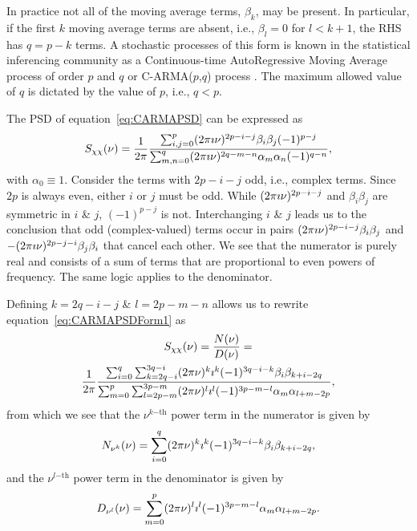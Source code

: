 \documentclass[a4paper,fleqn,usenatbib]{mnras}
\begin{document}
In practice not all of the moving average terms, $\beta_{k}$, may be present. In particular, if the first $k$ moving average terms are absent, i.e., $\beta_{l} = 0$ for $l < k+1$, the RHS has $q = p - k$ terms. A stochastic processes of this form is known in the statistical inferencing community as a Continuous-time AutoRegressive Moving Average process of order $p$ and $q$ or C-ARMA($p$,$q$) process \citep{DimensionEstimationBrockwell,HandbookOfStatistics19Brockwell,Brockwell14,Kelly14}. The maximum allowed value of $q$ is dictated by the value of $p$, i.e., $q < p$.

The PSD of equation~\eqref{eq:CARMAPSD} can be expressed as
\begin{equation}\label{eq:CARMAPSDForm1}
S_{\chi\chi}(\nu) = \frac{1}{2 \pi }\frac{\sum_{i,j = 0}^{p} (2 \pi \imath \nu)^{2p - i -j} \beta_{i} \beta_{j} (-1)^{p - j}}{\sum_{m,n = 0}^{q} (2 \pi \imath \nu)^{2q - m -n} \alpha_{m} \alpha_{n} (-1)^{q - n}},
\end{equation}
with $\alpha_{0} \equiv 1$. Consider the terms with $2p - i - j$ odd, i.e., complex terms. Since $2p$ is always even, either $i$ or $j$ must be odd. While $(2 \pi \imath \nu)^{2p - i -j}$ and $\beta_{i} \beta_{j}$ are symmetric in $i$ \& $j$, $(-1)^{p - j}$ is not. Interchanging $i$ \& $j$ leads us to the conclusion that odd (complex-valued) terms occur in pairs $(2 \pi \imath \nu)^{2p - i -j}\beta_{i} \beta_{j}$ and $-(2 \pi \imath \nu)^{2p - j -i}\beta_{j} \beta_{i}$ that cancel each other. We see that the numerator is purely real and consists of a sum of terms that are proportional to even powers of frequency. The same logic applies to the denominator.

Defining $k = 2q - i - j$ \& $l = 2p - m - n$ allows us to rewrite equation~\eqref{eq:CARMAPSDForm1} as
\begin{multline}\label{eq:CARMAPSDForm1}
S_{\chi\chi}(\nu) = \frac{N(\nu)}{D(\nu)} = \\ \frac{1}{2 \pi } \frac{\sum_{i = 0}^{q}\sum_{k = 2q - i}^{3q - i} (2\pi\nu)^{k} \imath^{k} (-1)^{3q - i - k} \beta_{i}\beta_{k + i - 2q}}{\sum_{m = 0}^{p}\sum_{l = 2p - m}^{3p - m} (2\pi\nu)^{l} \imath^{l} (-1)^{3p - m - l} \alpha_{m}\alpha_{l + m - 2p}},
\end{multline}
from which we see that the $\nu^{k\mathrm{-th}}$ power term in the numerator is given by
\begin{equation}\label{eq:PSDNumerator}
N_{\nu^{k}}(\nu) = \sum_{i = 0}^{q} (2\pi\nu)^{k} \imath^{k} (-1)^{3q - i - k} \beta_{i}\beta_{k + i - 2q},
\end{equation}
and the $\nu^{l\mathrm{-th}}$ power term in the denominator is given by
\begin{equation}\label{eq:PSDDenominator}
D_{\nu^{l}}(\nu) = \sum_{m = 0}^{p} (2\pi\nu)^{l} \imath^{l} (-1)^{3p - m - l} \alpha_{m}\alpha_{l + m - 2p}.
\end{equation}
\end{document}
